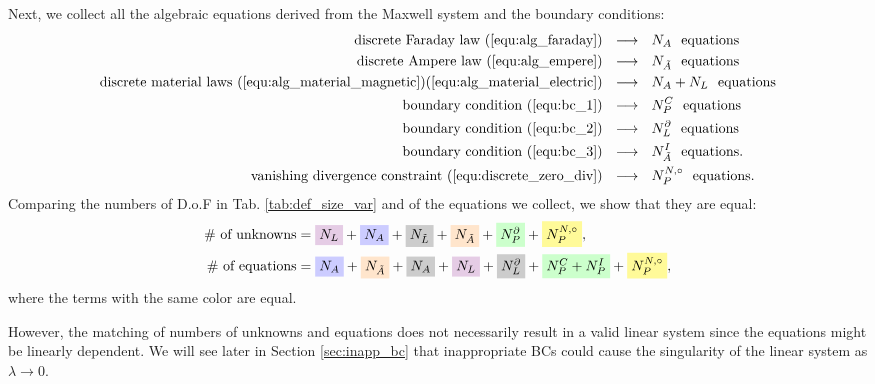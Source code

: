 \documentclass{article}
\begin{document}
Next, we collect all the algebraic equations derived from the Maxwell system and the boundary conditions: 
\begin{align*}
    \text{discrete Faraday law (\ref{equ:alg_faraday})} \ \ &\longrightarrow\ \  N_A \ \ \text{equations} \\
    \text{discrete Ampere law (\ref{equ:alg_empere})} \ \ &\longrightarrow\ \  N_{\Tilde{A}} \ \ \text{equations} \\
    \text{discrete material laws (\ref{equ:alg_material_magnetic})(\ref{equ:alg_material_electric})} \ \ &\longrightarrow\ \  N_A + N_L \ \ \text{equations} \\
    \text{boundary condition (\ref{equ:bc_1})} \ \ &\longrightarrow\ \  N_P^C \ \ \text{equations} \\
    \text{boundary condition (\ref{equ:bc_2})} \ \ &\longrightarrow\ \  N_L^\partial \ \ \text{equations} \\
    \text{boundary condition (\ref{equ:bc_3})} \ \ &\longrightarrow\ \  N_{\Tilde{A}}^I \ \ \text{equations}. \\
    \text{vanishing divergence constraint (\ref{equ:discrete_zero_div})} \ \ &\longrightarrow\ \  N_P^{N,\circ} \ \ \text{equations}. \\
\end{align*}
Comparing the numbers of D.o.F in Tab. \ref{tab:def_size_var} and of the equations we collect, we show that they are equal:
\begin{align*}
    \#\text{ of unknowns} &= \colorbox{violet!20}{$N_L$} + \colorbox{blue!20}{$N_A$} + \colorbox{gray!40}{$N_{\Tilde{L}}$} + \colorbox{orange!20}{$N_{\Tilde{A}}$} + \colorbox{green!20}{$N_P^\partial$} + \colorbox{yellow!40}{$N_P^{N,\circ}$}, \\
    \#\text{ of equations} &= \colorbox{blue!20}{$N_A$} + \colorbox{orange!20}{$N_{\Tilde{A}}$} + \colorbox{gray!40}{$N_A$} + \colorbox{violet!20}{$N_L$} + \colorbox{gray!40}{$N_L^\partial$} + \colorbox{green!20}{$N_P^C + N_P^I$}+ \colorbox{yellow!40}{$N_P^{N,\circ}$},
\end{align*}
where the terms with the same color are equal.

However, the matching of numbers of unknowns and equations does not necessarily result in a valid linear system since the equations might be linearly dependent. We will see later in Section \ref{sec:inapp_bc} that inappropriate BCs could cause the singularity of the linear system as $\lambda \rightarrow 0$. 
\end{document}
